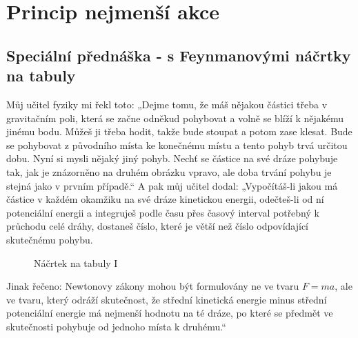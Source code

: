 \setchaptertoc
\chapter{Princip nejmenší akce}\label{fyz:IIchapXIX}


  \section{Speciální přednáška - s Feynmanovými náčrtky na tabuly}\label{fyz:IIchapXIXsecI}
    Můj učitel fyziky mi řekl toto: „Dejme tomu, že máš nějakou částici třeba v gravitačním poli,
    která se začne odněkud pohybovat a volně se blíží k nějakému jinému bodu. Můžeš ji třeba hodit,
    takže bude stoupat a potom zase klesat. Bude se pohybovat z původního místa ke konečnému místu a
    tento pohyb trvá určitou dobu. Nyní si mysli nějaký jiný pohyb. Nechť se částice na své dráze
    pohybuje tak, jak je znázorněno na druhém obrázku vpravo, ale doba trvání pohybu je stejná jako
    v prvním případě.“ A pak můj učitel dodal: „Vypočítáš-li jakou má částice v každém okamžiku na
    své dráze kinetickou energii, odečteš-li od ní potenciální energii a integruješ podle času přes
    časový interval potřebný k průchodu celé dráhy, dostaneš číslo, které je větší než číslo
    odpovídající skutečnému pohybu.

    \begin{figure}[ht!]
      \centering
       \hfill
      \caption{Náčrtek na tabuly I}
      \label{fyz:fig0651}
    \end{figure}

    Jinak řečeno: Newtonovy zákony mohou být formulovány ne ve tvaru \(F=ma\), ale ve tvaru, který
    odráží skutečnost, že střední kinetická energie minus střední potenciální energie má nejmenší
    hodnotu na té dráze, po které se předmět ve skutečnosti pohybuje od jednoho místa k druhému.“

